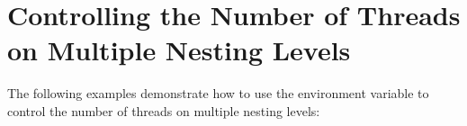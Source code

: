\pagebreak
\chapter{Controlling the Number of Threads on Multiple Nesting Levels}
\label{chap:nthrs_nesting}

The following examples demonstrate how to use the  environment 
variable  to control the number of threads on multiple nesting levels:




